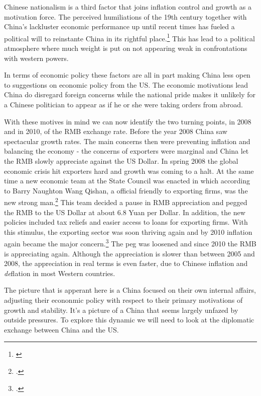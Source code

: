 Chinese nationalism is a third factor that joins inflation control and 
growth as a motivation force. The perceived humiliations of the 19th 
century together with China's lackluster economic performance up until 
recent times has fueled a political will to reinstante China in its 
rightful place.\footnote{\cite{hughes2006}} This has lead to a political 
atmosphere where much weight is put on not appearing weak in 
confrontations with western powers.

In terms of economic policy these factors are all in part making China
less open to suggestions on economic policy from the US. The economic 
motivations lead China do disregard foreign concerns while the national 
pride makes it unlikely for a Chinese politician to appear as if he or 
she were taking orders from abroad.  

With these motives in mind we can now identify the two turning points, 
in 2008 and in 2010, of the RMB exchange rate. Before the year 2008 
China saw spectacular growth rates.  The main concerns then were 
preventing inflation and balancing the economy - the concerns of 
exporters were marginal and China let the RMB slowly appreciate against 
the US Dollar. In spring 2008 the global economic crisis hit exporters 
hard and growth was coming to a halt. At the same time a new economic 
team at the State Council was enacted in which according to Barry 
Naughton Wang Qishan, a official friendly to exporting firms, was the 
new strong man.\footnote{\cite{Naughton2008}.} This team decided a pause 
in RMB appreciation and pegged the RMB to the US Dollar at about 6.8 
Yuan per Dollar. In addition, the new policies included tax reliefs and 
easier access to loans for exporting firms. With this stimulus, the 
exporting sector was soon thriving again and by 2010 inflation again 
became the major concern.\footnote{\cite{Naughton2010}.} The peg was 
loosened and since 2010 the RMB is appreciating again. Although the 
appreciation is slower than between 2005 and 2008, the appreciation in 
real terms is even faster, due to Chinese inflation and \emph{de}flation 
in most Western countries.

The picture that is apperant here is a China focused on their own 
internal affairs, adjusting their econonmic policy with respect to their 
primary motivations of growth and stability. It's a picture of a China 
that seems largely unfazed by outside pressures. To explore this dynamic 
we will need to look at the diplomatic exchange between China and the 
US.
